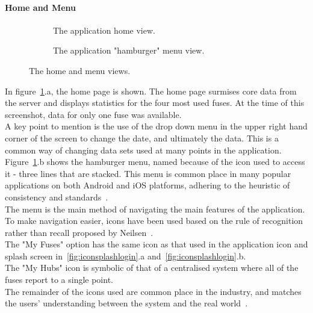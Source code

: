 \documentclass[draft,preprint,12pt,3p]{elsarticle}
\begin{document}
\paragraph{Home and Menu}
\begin{figure}[H]
    \centering
    \begin{subfigure}[t]{0.32\columnwidth}
        \centering
        \caption{The application home view.}
    \end{subfigure}
    \begin{subfigure}[t]{0.32\columnwidth}
        \centering
        \caption{The application "hamburger" menu view.}
    \end{subfigure}
    \caption{The home and menu views.}
    \label{fig:homemenu}
\end{figure}
In figure~\ref{fig:homemenu}.a, the home page is shown. The home page surmises core data from the server and displays statistics for the four most used fuses. At the time of this screenshot, data for only one fuse was available.\\
A key point to mention is the use of the drop down menu in the upper right hand corner of the screen to change the date, and ultimately the data. This is a common way of changing data sets used at many points in the application.\\
Figure~\ref{fig:homemenu}.b shows the hamburger menu, named because of the icon used to access it - three lines that are stacked. This menu is common place in many popular applications on both Android and iOS platforms, adhering to the heuristic of consistency and standards~\cite{nielsen}.\\
The menu is the main method of navigating the main features of the application. To make navigation easier, icons have been used based on the rule of recognition rather than recall proposed by Neilsen~\cite{nielsen}.\\
The "My Fuses" option has the same icon as that used in the application icon and splash screen in~\ref{fig:iconsplashlogin}.a and~\ref{fig:iconsplashlogin}.b.\\ 
The "My Hubs" icon is symbolic of that of a centralised system where all of the fuses report to a single point.\\ 
The remainder of the icons used are common place in the industry, and matches the users' understanding between the system and the real world~\cite{nielsen}.
\end{document}

